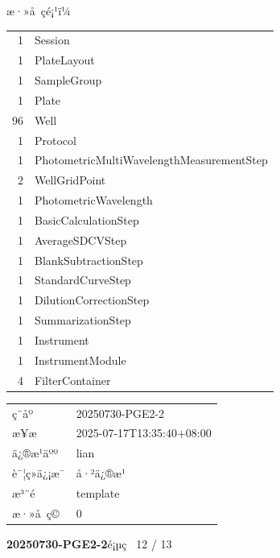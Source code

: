 \documentclass[UTF8,10pt,a4paper,fontset=fandol]{ctexart}
\newcommand{\fieldvalue}[1]{#1}
\begin{document}
\begin{center}
\begin{center}
\medskip
æ·»å çé¡¹ï¼

\begin{tabular}{rl}
1 & Session\\
1 & PlateLayout\\
1 & SampleGroup\\
1 & Plate\\
96 & Well\\
1 & Protocol\\
1 & PhotometricMultiWavelengthMeasurementStep\\
2 & WellGridPoint\\
1 & PhotometricWavelength\\
1 & BasicCalculationStep\\
1 & AverageSDCVStep\\
1 & BlankSubtractionStep\\
1 & StandardCurveStep\\
1 & DilutionCorrectionStep\\
1 & SummarizationStep\\
1 & Instrument\\
1 & InstrumentModule\\
4 & FilterContainer\\
\end{tabular}

\medskip

\begin{tabular}{ll}
ç¨åº &
\fieldvalue{20250730-PGE2-2}\\
æ¥æ &
\fieldvalue{2025-07-17T13:35:40+08:00}\\
ä¿®æ¹äºº &
\fieldvalue{lian}\\
è¯¦ç»ä¿¡æ¯ &
\fieldvalue{å·²ä¿®æ¹}\\
æ³¨é &
\fieldvalue{template}\\
æ·»å ç© &
\fieldvalue{0}
\end{tabular}

\newpage

\noindent\textbf{20250730-PGE2-2}\hfill é¡µç  12 / 13

\medskip


\end{center}
\end{center}
\end{document}
